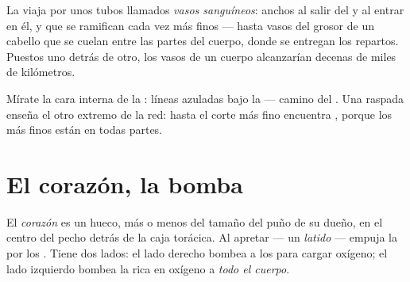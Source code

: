 \begin{definition}\label{def:g4:heart-and-blood:vessels}
La  viaja por unos tubos llamados \emph{vasos
sanguíneos}: anchos al salir del  y al
entrar en él, y que se ramifican cada vez más finos --- hasta vasos
del grosor de un cabello que se cuelan entre las partes del cuerpo, donde
se entregan los repartos. Puestos uno detrás de otro, los vasos de un
cuerpo alcanzarían decenas de miles de kilómetros.
\end{definition}

\begin{remark}\label{rem:g4:heart-and-blood:see}
Mírate la cara interna de la : líneas azuladas bajo la  ---
 camino del . Una  raspada enseña el
otro extremo de la red: hasta el corte más fino encuentra ,
porque los  más finos están en todas partes.
\end{remark}

\section{El corazón, la bomba}

\begin{definition}[El corazón]\label{def:g4:heart-and-blood:heart}
El \emph{corazón} es un  hueco, más o menos del
tamaño del puño de su dueño, en el centro del pecho detrás de la caja
torácica. Al apretar --- un \emph{latido} --- empuja la
 por los . Tiene dos lados: el lado derecho bombea  a
los \emph{} para cargar oxígeno; el lado izquierdo bombea la
 rica en oxígeno a \emph{todo el cuerpo}.
\end{definition}

